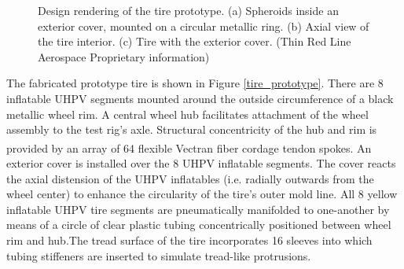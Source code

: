 \documentclass{article}
\begin{document}
\begin{figure}[hbt!]
\begin{minipage}{0.32\textwidth}
    \end{minipage}
    \caption{Design rendering of the tire prototype. (a) Spheroids inside an exterior cover, mounted on a circular metallic ring. (b) Axial view of the tire interior. (c) Tire with the exterior cover. (Thin Red Line Aerospace Proprietary information)}
    \label{tire_design}
\end{figure}

The fabricated prototype tire is shown in Figure \ref{tire_prototype}. There are 8 inflatable UHPV segments mounted around the outside circumference of a black metallic wheel rim. A central wheel hub facilitates attachment of the wheel assembly to the test rig's axle. Structural concentricity of the hub and rim is provided by an array of 64 flexible Vectran\textsuperscript{\textregistered} fiber cordage tendon spokes. An exterior cover is installed over the 8 UHPV inflatable segments. The cover reacts the axial distension of the UHPV inflatables (i.e. radially outwards from the wheel center) to enhance the circularity of the tire's outer mold line. All 8 yellow inflatable UHPV tire segments are pneumatically manifolded to one-another by means of a circle of clear plastic tubing concentrically positioned between wheel rim and hub.The tread surface of the tire incorporates 16 sleeves into which tubing stiffeners are inserted to simulate tread-like protrusions. 
\end{document}
